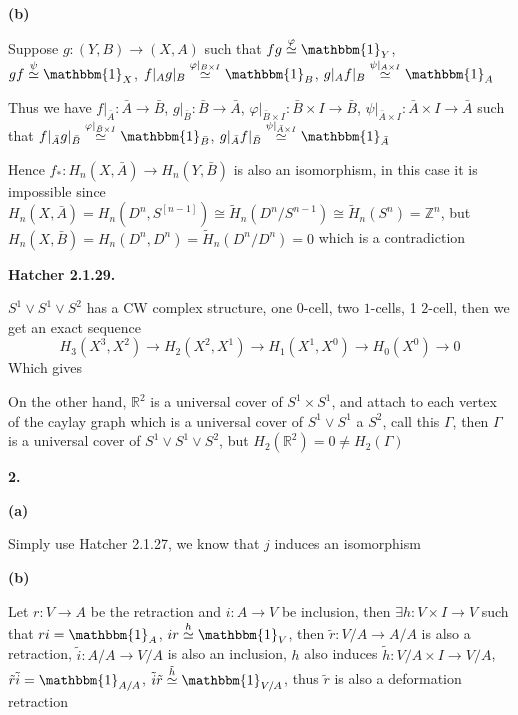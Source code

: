 \documentclass[../main.tex]{subfiles}
\begin{document}
\textbf{(b)} \par
Suppose $g:(Y,B)\rightarrow (X,A)$ such that $fg\overset{\varphi}{\simeq}\mathbbm{1}_Y$, $gf\overset{\psi}{\simeq}\mathbbm{1}_X$, $f|_Ag|_B\overset{\varphi|_{B\times I}}{\simeq}\mathbbm{1}_B$, $g|_Af|_B\overset{\psi|_{A\times I}}{\simeq}\mathbbm{1}_A$ \par
Thus we have $f|_{\bar{A}}:\bar{A}\rightarrow\bar{B}$, $g|_{\bar{B}}:\bar{B}\rightarrow\bar{A}$, $\varphi|_{\bar{B}\times I}:\bar{B}\times I\rightarrow\bar{B}$, $\psi|_{\bar{A}\times I}:\bar{A}\times I\rightarrow\bar{A}$ such that $f|_{\bar{A}}g|_{\bar{B}}\overset{\varphi|_{\bar{B}\times I}}{\simeq}\mathbbm{1}_{\bar{B}}$, $g|_{\bar{A}}f|_{\bar{B}}\overset{\psi|_{\bar{A}\times I}}{\simeq}\mathbbm{1}_{\bar{A}}$  \par
Hence $f_*:H_n(X,\bar{A})\rightarrow H_n(Y,\bar{B})$ is also an isomorphism, in this case it is impossible since $H_n(X,\bar{A})=H_n(D^n,S^[n-1])\cong\tilde{H}_n(D^n/S^{n-1})\cong\tilde{H}_n(S^n)=\mathbb{Z}^n$, but $H_n(X,\bar{B})=H_n(D^n,D^n)=\tilde{H}_n(D^n/D^n)=0$ which is a contradiction \par
\textbf{Hatcher 2.1.29.} \par
$S^1\vee S^1\vee S^2$ has a CW complex structure, one $0$-cell, two $1$-cells, 1 $2$-cell, then we get an exact sequence
\[H_3(X^3,X^2)\rightarrow H_2(X^2,X^1)\rightarrow H_1(X^1,X^0)\rightarrow H_0(X^0)\rightarrow 0\]
Which gives  \par
On the other hand, $\mathbb{R}^2$ is a universal cover of $S^1\times S^1$, and attach to each vertex of the caylay graph which is a universal cover of $S^1\vee S^1$ a $S^2$, call this $\Gamma$, then $\Gamma$ is a universal cover of  $S^1\vee S^1\vee S^2$, but $H_2(\mathbb{R}^2)=0\neq H_2(\Gamma)$ \par
\textbf{2.} \par
\textbf{(a)} \par
Simply use Hatcher 2.1.27, we know that $j$ induces an isomorphism \par
\textbf{(b)} \par
Let $r:V\rightarrow A$ be the retraction and $i:A\rightarrow V$ be inclusion, then $\exists h:V\times I\rightarrow V$ such that $ri=\mathbbm{1}_A$, $ir\overset{h}{\simeq}\mathbbm{1}_V$, then $\tilde{r}:V/A\rightarrow A/A$ is also a retraction, $\tilde{i}:A/A\rightarrow V/A$ is also an inclusion, $h$ also induces $\tilde{h}:V/A\times I\rightarrow V/A$, $\tilde{r}\tilde{i}=\mathbbm{1}_{A/A}$, $\tilde{i}\tilde{r}\overset{\tilde{h}}{\simeq}\mathbbm{1}_{V/A}$, thus $\tilde{r}$ is also a deformation retraction \par
\end{document}
